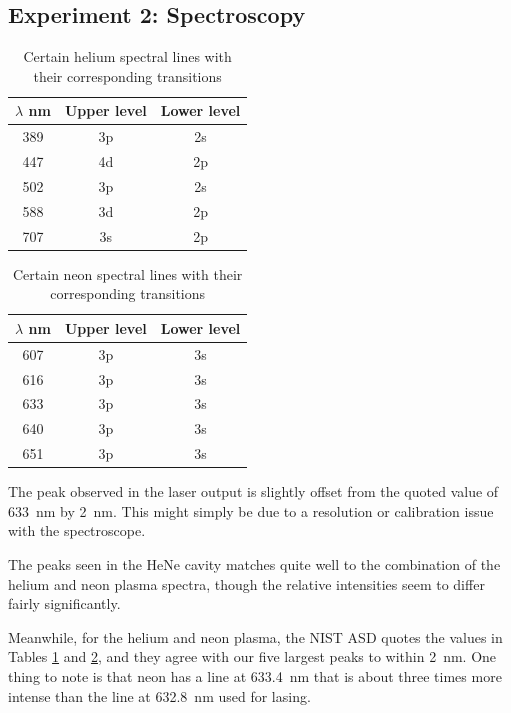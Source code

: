 \documentclass[a4paper]{scrartcl}
\begin{document}
\subsection{Experiment 2: Spectroscopy}
\begin{table}
    \centering
    \begin{tabular}{c | c | c}
        \(\lambda\) \si{\nano\metre} & Upper level & Lower level \\
        \hline
        389 & 3p & 2s \\
        447 & 4d & 2p \\
        502 & 3p & 2s \\
        588 & 3d & 2p \\
        707 & 3s & 2p
    \end{tabular}
    \caption{Certain helium spectral lines with their corresponding transitions}
    \label{tab:helium-lines}
\end{table}
\begin{table}
    \centering
    \begin{tabular}{c | c | c}
        \(\lambda\) \si{\nano\metre} & Upper level & Lower level \\
        \hline
        607 & 3p & 3s \\
        616 & 3p & 3s \\
        633 & 3p & 3s \\
        640 & 3p & 3s \\
        651 & 3p & 3s
    \end{tabular}
    \caption{Certain neon spectral lines with their corresponding transitions}
    \label{tab:neon-lines}
\end{table}
The peak observed in the laser output is slightly offset from the quoted value of \SI{633}{\nano\metre} by \SI{2}{\nano\metre}. This might simply be due to a resolution or calibration issue with the spectroscope.

The peaks seen in the HeNe cavity matches quite well to the combination of the helium and neon plasma spectra, though the relative intensities seem to differ fairly significantly.

Meanwhile, for the helium and neon plasma, the NIST ASD quotes the values in Tables \ref{tab:helium-lines} and \ref{tab:neon-lines}, and they agree with our five largest peaks to within \SI{2}{\nano\metre}. One thing to note is that neon has a line at \SI{633.4}{\nano\metre} that is about three times more intense than the line at \SI{632.8}{\nano\metre} used for lasing.
\end{document}
